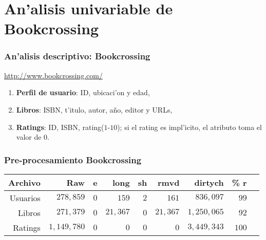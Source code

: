 \documentclass{beamer}
\begin{document}
\section{An'alisis univariable de Bookcrossing}
\begin{frame}[label=bookdata]
\frametitle{An'alisis descriptivo: Bookcrossing}
\begin{center}
\url{http://www.bookcrossing.com/}
\end{center}
\begin{enumerate}
     \setlength\itemsep{0.7cm}
    \item \textbf{Perfil de usuario}: ID, ubicaci'on y edad, 
    \item \textbf{Libros}: ISBN, t'itulo, autor, a\~{n}o, editor y URLs, 
    \item \textbf{Ratings}: ID, ISBN, rating($1$-$10$); si el rating es impl'icito, el atributo toma el valor de $0$.
\end{enumerate}
\end{frame}
\begin{frame}[label=bookprepro]
\frametitle{Pre-procesamiento Bookcrossing}
\begin{table}[ht]
    \vspace{0.5cm}
    \begin{center}
    \begin{small}
    \begin{tabular}{|r|r|r|r|r|r|r|r|r|} \hline
    \textbf{Archivo} & \textbf{Raw} &  \textbf{e}&  \textbf{long} &  \textbf{sh} &  \textbf{rmvd} &  \textbf{dirtych} & \% \textbf{r}\\ [0.5ex]\hline
    Usuarios & $278,859$ & $0$ & $159$ & $2$ & $161$ & $836,097$  & $99$ \\\hline
    Libros  & $271,379$ & $0$ & $21,367$ & $0$ & $21,367$ & $1,250,065$&  $92$ \\\hline
    Ratings  & $1,149,780$ & $0$ & $0$ & $0$ & $0$ & $3,449,343$ &  $100$ \\\hline
    \end{tabular}
    \end{small}
    \end{center}
\end{table}
\end{frame} 
\end{document}
